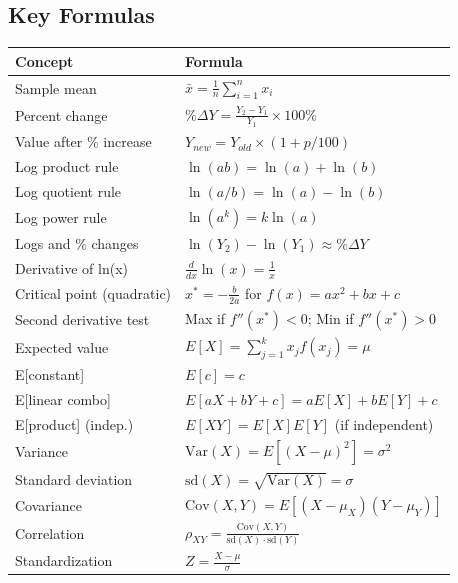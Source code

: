 \documentclass[
  letterpaper,
  DIV=11,
  numbers=noendperiod]{scrreprt}
\newcounter{none} %
\begin{document}
\subsection{Key Formulas}\label{key-formulas}

{\def\LTcaptype{none} %
\begin{longtable}[]{@{}
  >{\raggedright\arraybackslash}p{}
  >{\raggedright\arraybackslash}p{}@{}}
\toprule\noalign{}
\begin{minipage}[b]{\linewidth}\raggedright
Concept
\end{minipage} & \begin{minipage}[b]{\linewidth}\raggedright
Formula
\end{minipage} \\
\midrule\noalign{}
\endhead
\bottomrule\noalign{}
\endlastfoot
Sample mean & \(\bar{x} = \frac{1}{n}\sum_{i=1}^{n} x_i\) \\
Percent change & \(\%\Delta Y = \frac{Y_2 - Y_1}{Y_1} \times 100\%\) \\
Value after \% increase & \(Y_{new} = Y_{old} \times (1 + p/100)\) \\
Log product rule & \(\ln(ab) = \ln(a) + \ln(b)\) \\
Log quotient rule & \(\ln(a/b) = \ln(a) - \ln(b)\) \\
Log power rule & \(\ln(a^k) = k\ln(a)\) \\
Logs and \% changes & \(\ln(Y_2) - \ln(Y_1) \approx \%\Delta Y\) \\
Derivative of ln(x) & \(\frac{d}{dx}\ln(x) = \frac{1}{x}\) \\
Critical point (quadratic) & \(x^* = -\frac{b}{2a}\) for
\(f(x) = ax^2 + bx + c\) \\
Second derivative test & Max if \(f''(x^*) < 0\); Min if
\(f''(x^*) > 0\) \\
Expected value & \(E[X] = \sum_{j=1}^{k} x_j f(x_j) = \mu\) \\
E{[}constant{]} & \(E[c] = c\) \\
E{[}linear combo{]} & \(E[aX + bY + c] = aE[X] + bE[Y] + c\) \\
E{[}product{]} (indep.) & \(E[XY] = E[X]E[Y]\) (if independent) \\
Variance & \(\text{Var}(X) = E[(X-\mu)^2] = \sigma^2\) \\
Standard deviation & \(\text{sd}(X) = \sqrt{\text{Var}(X)} = \sigma\) \\
Covariance & \(\text{Cov}(X,Y) = E[(X-\mu_X)(Y-\mu_Y)]\) \\
Correlation &
\(\rho_{XY} = \frac{\text{Cov}(X,Y)}{\text{sd}(X) \cdot \text{sd}(Y)}\) \\
Standardization & \(Z = \frac{X - \mu}{\sigma}\) \\
\end{longtable}
}
\end{document}
